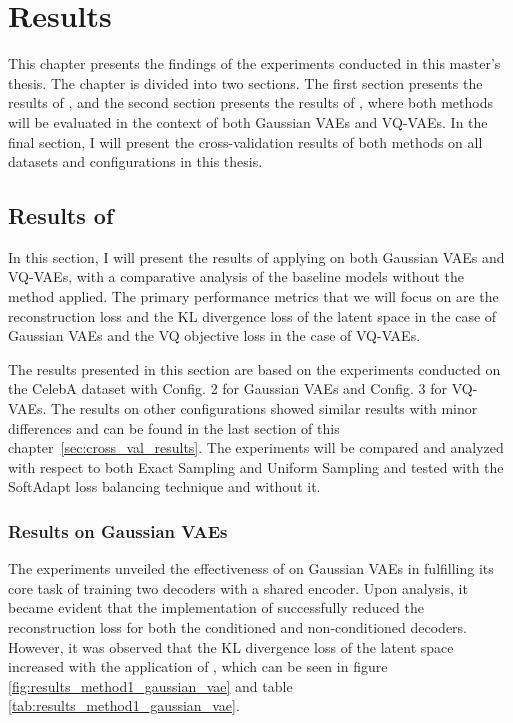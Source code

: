 \chapter{Results}

This chapter presents the findings of the experiments conducted in this master's thesis. The chapter is divided into two sections.
The first section presents the results of , and the second section presents the results of , where both methods will be evaluated in the context of both Gaussian VAEs and VQ-VAEs. In the final section, I will present the cross-validation results of both methods on all datasets and configurations in this thesis.

\section{Results of }

In this section, I will present the results of applying  on both Gaussian VAEs and VQ-VAEs, with a comparative analysis of the baseline models without the method applied. The primary performance metrics that we will focus on are the reconstruction loss and the KL divergence loss of the latent space in the case of Gaussian VAEs and the VQ objective loss in the case of VQ-VAEs. 

The results presented in this section are based on the experiments conducted on the CelebA dataset with Config. 2 for Gaussian VAEs and Config. 3 for VQ-VAEs. The results on other configurations showed similar results with minor differences and can be found in the last section of this chapter~\ref{sec:cross_val_results}. The experiments will be compared and analyzed with respect to both Exact Sampling and Uniform Sampling and tested with the SoftAdapt loss balancing technique and without it. 

\subsection{Results on Gaussian VAEs}

The experiments unveiled the effectiveness of  on Gaussian VAEs in fulfilling its core task of training two decoders with a shared encoder. Upon analysis, it became evident that the implementation of  successfully reduced the reconstruction loss for both the conditioned and non-conditioned decoders. However, it was observed that the KL divergence loss of the latent space increased with the application of , which can be seen in figure \ref{fig:results_method1_gaussian_vae} and table \ref{tab:results_method1_gaussian_vae}.

